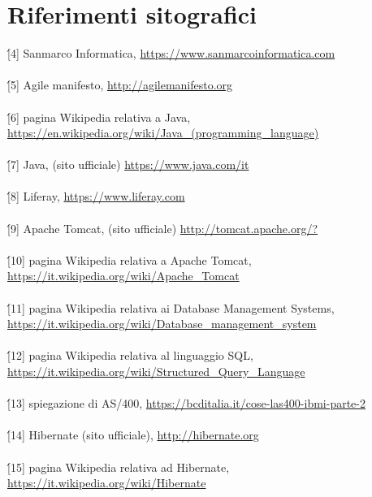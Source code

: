 \section*{Riferimenti sitografici}
\'[4] Sanmarco Informatica, \href{https://www.sanmarcoinformatica.com/}{https://www.sanmarcoinformatica.com}\\
\\
\'[5] Agile manifesto, \href{http://agilemanifesto.org}{http://agilemanifesto.org}\\
\\
\'[6] pagina Wikipedia relativa a Java, \href{https://en.wikipedia.org/wiki/Java_(programming_language)}{https://en.wikipedia.org/wiki/Java\_(programming\_language)}\\
\\
\'[7] Java, (sito ufficiale) \href{https://www.java.com/it}{https://www.java.com/it}\\
\\
\'[8] Liferay, \href{https://www.liferay.com}{https://www.liferay.com}\\
\\
\'[9] Apache Tomcat, (sito ufficiale) \href{http://tomcat.apache.org/?}{http://tomcat.apache.org/?}\\
\\
\'[10] pagina Wikipedia relativa a Apache Tomcat, \href{https://it.wikipedia.org/wiki/Apache_Tomcat}{https://it.wikipedia.org/wiki/Apache\_Tomcat}\\
\\
\'[11] pagina Wikipedia relativa ai Database Management Systems, \href{https://it.wikipedia.org/wiki/Database_management_system}{https://it.wikipedia.org/wiki/Database\_management\_system}\\
\\
\'[12] pagina Wikipedia relativa al linguaggio SQL, \href{https://it.wikipedia.org/wiki/Structured_Query_Language}{https://it.wikipedia.org/wiki/Structured\_Query\_Language}\\
\\
\'[13] spiegazione di AS/400, \href{https://bcditalia.it/cose-las400-ibmi-parte-2/}{https://bcditalia.it/cose-las400-ibmi-parte-2}\\
\\
\'[14] Hibernate (sito ufficiale), \href{http://hibernate.org/}{http://hibernate.org}\\
\\
\'[15] pagina Wikipedia relativa ad Hibernate, \href{https://it.wikipedia.org/wiki/Hibernate}{https://it.wikipedia.org/wiki/Hibernate}\\
